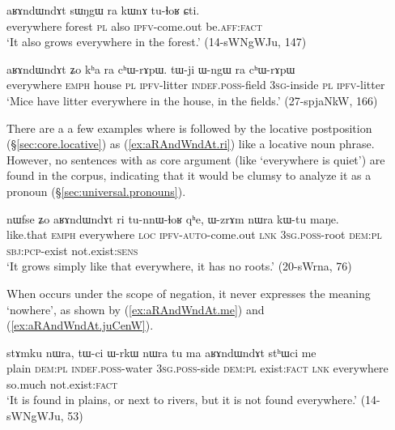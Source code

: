  \begin{exe}
\ex \label{ex:aRAndWndAt.Zo.loc}
\gll  aʁɤndɯndɤt sɯŋgɯ ra kɯnɤ tu-ɬoʁ ɕti. \\
everywhere forest \textsc{pl} also \textsc{ipfv}-come.out be.\textsc{aff}:\textsc{fact} \\
\glt `It also grows everywhere in the forest.' (14-sWNgWJu, 147)
\end{exe} 

 \begin{exe}
\ex \label{ex:aRAndWndAt.Zo.loc2}
\gll  aʁɤndɯndɤt ʑo kʰa ra cʰɯ-rɤpɯ. tɯ-ji ɯ-ngɯ ra cʰɯ-rɤpɯ \\
everywhere \textsc{emph} house \textsc{pl} \textsc{ipfv}-litter \textsc{indef}.\textsc{poss}-field \textsc{3sg}-inside \textsc{pl} \textsc{ipfv}-litter \\
\glt `Mice have litter everywhere in the house, in the fields.' (27-spjaNkW, 166)
\end{exe} 

There are a a few examples where  is followed  by the locative postposition  (§\ref{sec:core.locative}) as (\ref{ex:aRAndWndAt.ri}) like a locative noun phrase. However, no sentences with  as core argument (like `everywhere is quiet') are found in the corpus, indicating that it would be clumsy to analyze it as a pronoun (§\ref{sec:universal.pronouns}).

 \begin{exe}
\ex \label{ex:aRAndWndAt.ri}
\gll nɯfse ʑo aʁɤndɯndɤt ri tu-nnɯ-ɬoʁ qʰe, ɯ-zrɤm nɯra kɯ-tu maŋe. \\
like.that \textsc{emph} everywhere \textsc{loc} \textsc{ipfv}-\textsc{auto}-come.out \textsc{lnk} \textsc{3sg}.\textsc{poss}-root \textsc{dem}:\textsc{pl} \textsc{sbj}:\textsc{pcp}-exist not.exist:\textsc{sens} \\
\glt `It grows simply like that everywhere, it has no roots.' (20-sWrna, 76)
\end{exe} 

When  occurs under the scope of negation, it never expresses the meaning `nowhere', as shown by (\ref{ex:aRAndWndAt.me}) and (\ref{ex:aRAndWndAt.juCenW}).

\begin{exe}
\ex \label{ex:aRAndWndAt.me}
\gll stɤmku nɯra, tɯ-ci ɯ-rkɯ nɯra tu ma aʁɤndɯndɤt stʰɯci me \\
plain \textsc{dem}:\textsc{pl} \textsc{indef}.\textsc{poss}-water \textsc{3sg}.\textsc{poss}-side  \textsc{dem}:\textsc{pl} exist:\textsc{fact} \textsc{lnk} everywhere so.much not.exist:\textsc{fact} \\
\glt `It is found in plains, or next to rivers, but it is not found everywhere.' (14-sWNgWJu, 53)
\end{exe} 


